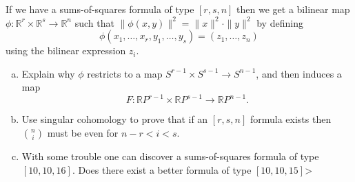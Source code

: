 \documentclass[letterpaper, 12pt]{article}
\begin{document}
\begin{problem}{5}
If we have a sums-of-squares formula of type \([r,s,n]\) then we get a bilinear map \(\phi:\mathbb{R}^r\times \mathbb{R}^s\rightarrow \mathbb{R}^n\) such that \(\| \phi(x,y)\|^2=\|x\|^2\cdot \|y\|^2\) by defining 
\[\phi(x_1,\ldots,x_r,y_1,\ldots,y_s)=(z_1,\ldots,z_n)\]
using the bilinear expression \(z_i\).
\begin{enumerate}[(a)]
\item Explain why \(\phi\) restricts to a map \(S^{r-1}\times S^{s-1}\rightarrow S^{n-1}\), and then induces a map 
\[F:\mathbb{R}P^{r-1}\times \mathbb{R}P^{s-1}\rightarrow \mathbb{R}P^{n-1}.\]
\item Use singular cohomology to prove that if an \([r,s,n]\) formula exists then \(n \choose i\) must be even for \(n-r<i<s\). 
\item With some trouble one can discover a sums-of-squares formula of type \([10,10,16]\). Does there exist a better formula of type \([10,10,15]\)>
\end{enumerate}
\end{problem}
\end{document}
